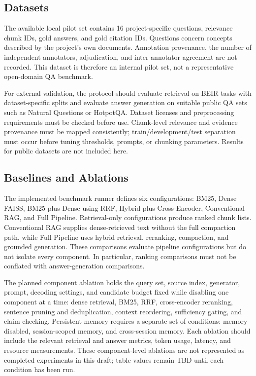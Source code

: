 \documentclass[conference]{IEEEtran}
\begin{document}
\subsection{Datasets}
The available local pilot set contains 16 project-specific questions,
relevance chunk IDs, gold answers, and gold citation IDs. Questions concern concepts
described by the project's own documents. Annotation provenance, the number
of independent annotators, adjudication, and inter-annotator agreement are
not recorded. This dataset is therefore an internal pilot set, not a
representative open-domain QA benchmark.

For external validation, the protocol should evaluate retrieval on BEIR tasks
with dataset-specific splits and evaluate answer generation on suitable
public QA sets such as Natural Questions or HotpotQA. Dataset licenses and
preprocessing requirements must be checked before use. Chunk-level relevance
and evidence provenance must be mapped consistently; train/development/test
separation must occur before tuning thresholds, prompts, or chunking
parameters. Results for public datasets are not included here.

\subsection{Baselines and Ablations}
The implemented benchmark runner defines six configurations: BM25, Dense
FAISS, BM25 plus Dense using RRF, Hybrid plus Cross-Encoder, Conventional RAG,
and Full Pipeline. Retrieval-only configurations produce ranked chunk lists.
Conventional RAG supplies dense-retrieved text without the full compaction
path, while Full Pipeline uses hybrid retrieval, reranking, compaction, and
grounded generation. These comparisons evaluate pipeline configurations but
do not isolate every component. In particular, ranking comparisons must not
be conflated with answer-generation comparisons.

The planned component ablation holds the query set, source index, generator,
prompt, decoding settings, and candidate budget fixed while disabling one
component at a time: dense retrieval, BM25, RRF, cross-encoder reranking,
sentence pruning and deduplication, context reordering, sufficiency gating,
and claim checking. Persistent memory requires a separate set of conditions:
memory disabled, session-scoped memory, and cross-session memory. Each
ablation should include the relevant retrieval and answer metrics, token
usage, latency, and resource measurements. These component-level ablations
are not represented as completed experiments in this draft; table values
remain TBD until each condition has been run.
\end{document}
